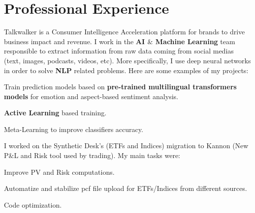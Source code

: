 \documentclass[]{deedy-resume-openfont}
\begin{document}
%
%
\lastupdated

%
%



\vspace{\topsep}

\section{Professional Experience}
\sectionsep

Talkwalker is a Consumer Intelligence Acceleration platform for brands to drive business impact and revenue. I work in the \textbf{AI $\&$ Machine Learning} team responsible to extract information from raw data coming from social medias (text, images, podcasts, videos, etc). More specifically, I use deep neural networks in order to solve \textbf{NLP} related problems. Here are some examples of my projects: $ $
\vspace{0.1cm}
\begin{tightemize}
	\item[\diamond] Train prediction models based on \textbf{pre-trained multilingual transformers models} for emotion and aspect-based sentiment analysis.
	\item[\diamond] \textbf{Active Learning} based training.
	\item[\diamond] Meta-Learning to improve classifiers accuracy.
\end{tightemize}

\sectionsep
\sectionsep

I worked on the Synthetic Desk's (ETFs and Indices) migration to Kannon (New P$\&$L and Risk tool used by trading). My main tasks were:
\vspace{0.1cm}
\begin{tightemize}
	\item[\diamond] Improve PV and Risk computations.
	\item[\diamond] Automatize and stabilize pcf file upload for ETFs/Indices from different sources.
	\item[\diamond] Code optimization.
\end{tightemize}
\end{document}
